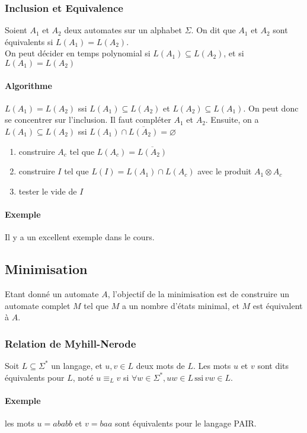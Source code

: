 \documentclass[a4paper]{article}
\begin{document}
  \subsubsection{Inclusion et Equivalence}
  Soient $A_1$ et $A_2$ deux automates sur un alphabet $\Sigma$. On dit que
  $A_1$ et $A_2$ sont équivalents si $L(A_1) = L(A_2)$.\\
  On peut décider en temps polynomial si $L(A_1) \subseteq L(A_2)$, et si $L(A_1) = L(A_2)$

  \paragraph{Algorithme}
  $L(A_1) = L(A_2)$ ssi $L(A_1) \subseteq L(A_2)$ et $L(A_2) \subseteq L(A_1)$.
  On peut donc se concentrer sur l'inclusion. Il faut compléter $A_1$ et $A_2$.
  Ensuite, on a $L(A_1) \subseteq L(A_2)$ ssi $L(A_1) \cap \overline{L(A_2)} = \varnothing$
  \begin{enumerate}
    \item construire $A_c$ tel que $L(A_c) = \overline{L(A_2)}$
    \item construire $I$ tel que $L(I) = L(A_1) \cap L(A_c)$ avec le produit $A_1 \otimes A_c$
    \item tester le vide de $I$
  \end{enumerate}

  \paragraph{Exemple} Il y a un excellent exemple dans le cours.


  \subsection{Minimisation}
  Etant donné un automate $A$, l'objectif de la minimisation est de construire un automate
  complet $M$ tel que $M$ a un nombre d'états minimal, et $M$ est équivalent à $A$.

  \subsubsection{Relation de Myhill-Nerode}
  Soit $L \subseteq \Sigma^*$ un langage, et $u,v\in L$ deux mots de $L$.
  Les mots $u$ et $v$ sont dits équivalents pour $L$, noté $u \equiv_L v$ si
  $ \forall w \in \Sigma^*, uw \in L\, \text{ssi}\, vw \in L$.

  \paragraph{Exemple} les mots $u=ababb$ et $v=baa$ sont équivalents pour le 
  langage PAIR.
\end{document}

